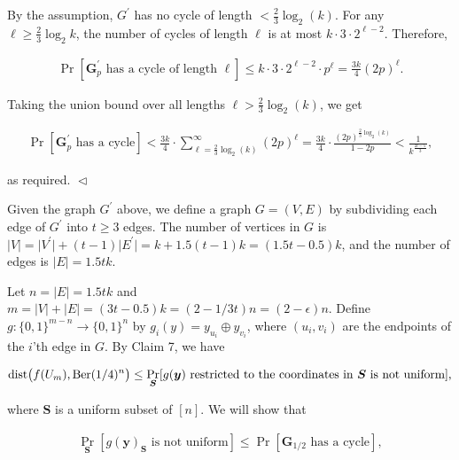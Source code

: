By the assumption, $G^{\prime}$ has no cycle of length $<\frac{2}{3}\log_{2}(k)$. For any $\ell\geq\frac{2}{3}\log_{2}k$, the number of cycles of length $\ell$ is at most $k\cdot 3\cdot 2^{\ell-2}$.
Therefore,\par


\[\begin{gathered}
\Pr[\text{$\boldsymbol{G}^{\prime}_{p}$ has a cycle of length $\ell$}]\leq k\cdot 3\cdot 2^{\ell-2}\cdot p^{\ell}=\frac{3k}{4}(2p)^{\ell}.
\end{gathered}\]


Taking the union bound over all lengths $\ell>\frac{2}{3}\log_{2}(k)$, we get\par


\[\begin{gathered}
\Pr[\text{$\boldsymbol{G}^{\prime}_{p}$ has a cycle}]<\frac{3k}{4}\cdot\sum_{\ell=\frac{2}{3}\log_{2}(k)}^{\infty}(2p)^{\ell}=\frac{3k}{4}\cdot\frac{(2p)^{\frac{2}{3}\log_{2}(k)}}{1-2p}<\frac{1}{k^{\frac{2t-5}{3}}},
\end{gathered}\]


as required.
$\vartriangleleft$\par




Given the graph $G^{\prime}$ above, we define a graph $G=(V,E)$ by subdividing each edge of $G^{\prime}$ into $t\geq 3$ edges.
The number of vertices in $G$ is $\lvert V\rvert=\lvert V^{\prime}\rvert+(t-1)\lvert E^{\prime}\rvert=k+1.5(t-1)k=(1.5t-0.5)k$, and the number of edges is $\lvert E\rvert=1.5tk$.\par




Let $n=\lvert E\rvert=1.5tk$ and $m=\lvert V\rvert+\lvert E\rvert=(3t-0.5)k=(2-1/3t)n=(2-\epsilon)n$.
Define $g\colon\{0,1\}^{m-n}\to\{0,1\}^{n}$ by $g_{i}(y)=y_{u_{i}}\oplus y_{v_{i}}$, where $(u_{i},v_{i})$ are the endpoints of the $i$’th edge in $G$.
By Claim 7, we have\par


\[\begin{gathered}
\mathrm{dist}\bigl(f(U_{m}),\textnormal{Ber}(1/4)^{n}\bigr)\leq\Pr_{\boldsymbol{S}}[\text{$g(\boldsymbol{y})$ restricted to the coordinates in $\boldsymbol{S}$ is not uniform}],
\end{gathered}\]


where $\boldsymbol{S}$ is a uniform subset of $[n]$.
We will show that\par


\[\begin{gathered}
\displaystyle\Pr_{\boldsymbol{S}}[\text{$g(\boldsymbol{y})_{\boldsymbol{S}}$ is not uniform}]\leq\Pr[\text{$\boldsymbol{G}_{1/2}$ has a cycle}],
\end{gathered}\]


